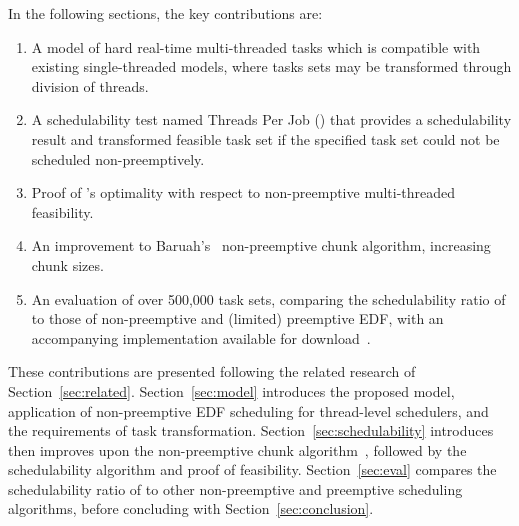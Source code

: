\documentclass[a4paper,UKenglish,cleveref,autoref,english]{lipics-v2019}
\begin{document}
In the following sections, the key contributions are:
\begin{enumerate}
  \item A model of hard real-time multi-threaded tasks which is
    compatible with existing single-threaded models, where tasks sets
    may be transformed through division of threads.
  \item A schedulability test named Threads Per Job (\tpj{}) that provides a
    schedulability result and transformed feasible task set if the
    specified task set could not be scheduled non-preemptively.
  \item Proof of \tpj{}'s optimality with respect to non-preemptive
    multi-threaded feasibility.
  \item An improvement to Baruah's~\cite{Baruah:2005}
    non-preemptive chunk algorithm, increasing chunk sizes.
  \item An evaluation of over 500,000 task sets, comparing the
    schedulability ratio of \tpj{} to those of non-preemptive and
    (limited) preemptive EDF, with an accompanying implementation available for
    download~\cite{NPM-Artifact:2019}.
\end{enumerate}

These contributions are presented following the related
research of Section~\ref{sec:related}. Section~\ref{sec:model}
introduces the proposed model, application of non-preemptive EDF
scheduling for thread-level schedulers, and the requirements of task
transformation. Section~\ref{sec:schedulability} introduces then
improves upon the non-preemptive chunk algorithm~\cite{Baruah:2005},
followed by the \tpj{} schedulability algorithm and proof of
feasibility. Section~\ref{sec:eval} compares the schedulability ratio
of \tpj{} to other non-preemptive and preemptive scheduling
algorithms, before concluding with Section~\ref{sec:conclusion}. 

  









\end{document}
